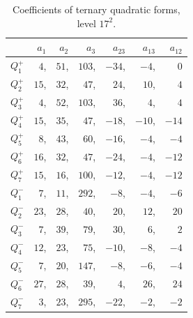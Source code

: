 \begin{table}
\begin{tabular}{|l|rrrrrr|}
\hline
 & $a_1$ & $a_2$ & $a_3$ & $a_{23}$ & $a_{13}$ & $a_{12}$ \\
\hline\hline
$Q_{1}^{+}$ & $4$,&$51$,&$103$,&$-34$,&$-4$,&$0$ \\
$Q_{2}^{+}$ & $15$,&$32$,&$47$,&$24$,&$10$,&$4$ \\
$Q_{3}^{+}$ & $4$,&$52$,&$103$,&$36$,&$4$,&$4$ \\
$Q_{4}^{+}$ & $15$,&$35$,&$47$,&$-18$,&$-10$,&$-14$ \\
$Q_{5}^{+}$ & $8$,&$43$,&$60$,&$-16$,&$-4$,&$-4$ \\
$Q_{6}^{+}$ & $16$,&$32$,&$47$,&$-24$,&$-4$,&$-12$ \\
$Q_{7}^{+}$ & $15$,&$16$,&$100$,&$-12$,&$-4$,&$-12$ \\
\hline
$Q_{1}^{-}$ & $7$,&$11$,&$292$,&$-8$,&$-4$,&$-6$ \\
$Q_{2}^{-}$ & $23$,&$28$,&$40$,&$20$,&$12$,&$20$ \\
$Q_{3}^{-}$ & $7$,&$39$,&$79$,&$30$,&$6$,&$2$ \\
$Q_{4}^{-}$ & $12$,&$23$,&$75$,&$-10$,&$-8$,&$-4$ \\
$Q_{5}^{-}$ & $7$,&$20$,&$147$,&$-8$,&$-6$,&$-4$ \\
$Q_{6}^{-}$ & $27$,&$28$,&$39$,&$4$,&$26$,&$24$ \\
$Q_{7}^{-}$ & $3$,&$23$,&$295$,&$-22$,&$-2$,&$-2$ \\
\hline
\end{tabular}
\caption{Coefficients of ternary quadratic forms, level $17^2$.
          \label{table:qf3:17}}
\end{table}

